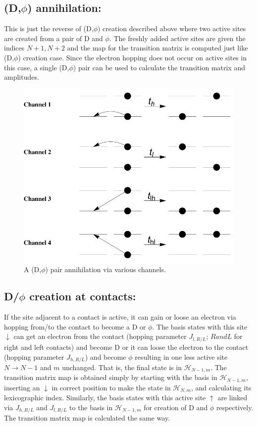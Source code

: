 \documentclass[a4paper,twocolumn]{revtex4-1} %
\newcommand{\da}{\downarrow}
\newcommand{\ua}{\uparrow}
\begin{document}
\subsection{(D,$\phi$) annihilation: }
This is just the reverse of (D,$\phi$) creation described above where two active sites are created
from a pair of D and $\phi$. The freshly added active sites are given the indices $N+1,N+2$
and the map for the transition matrix is computed just like (D,$\phi$) creation case.
Since the electron hopping does not occur on active sites in this case,
a single (D,$\phi$) pair can be used to calculate the transition matrix and amplitudes.
\begin{figure}[htpb]
  \centering
  \includegraphics[width=0.4\columnwidth]{PhiDAnnihilation}
   \caption{A (D,$\phi$) pair annihilation via various channels.
 \label{fig:phihops}}  
\end{figure}



\subsection{ D/$\phi$ creation at contacts: }
If the site adjacent to a contact is active, 
it can gain or loose an electron via hopping from/to the contact to become a D or $\phi$.
The basis states with this site $\da$ 
can get an electron from the contact (hopping parameter $J_{l,R/L}$; $R and L$ for right and left contacts)
and become D or it can loose the electron to the contact (hopping parameter $J_{h,R/L}$)
and become $\phi$
resulting in one less active site $N\rightarrow N-1$ and $m$ unchanged.
That is, the final state is in $\mathcal{H}_{N-1,m}$. 
The transition matrix map is obtained simply by starting with the basis in $\mathcal{H}_{N-1,m}$,
inserting an $\da$ in correct position to make the state in $\mathcal{H}_{N,m}$,
and calculating its lexicographic index.
Similarly, the basis states with this active site $\ua$ 
are linked via $J_{h,R/L}$ and $J_{l,R/L}$ to 
the basis in $\mathcal{H}_{N-1,m}$
for creation of D and $\phi$ respectively.
The transition matrix map is calculated the same way.
\end{document}
